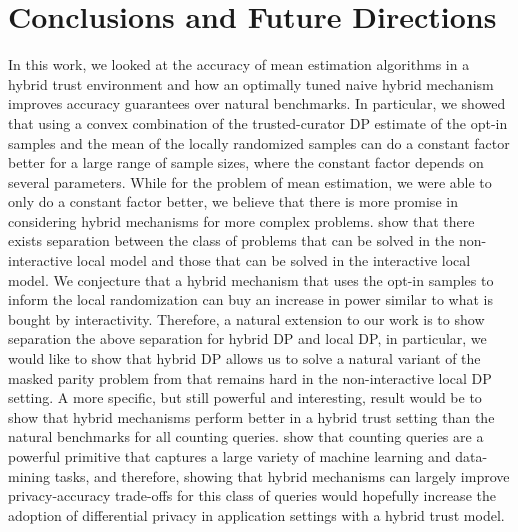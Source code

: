 \documentclass{article}
\theoremstyle{plain}
\begin{document}
\section{Conclusions and Future Directions}
In this work, we looked at the accuracy of mean estimation algorithms in a hybrid trust environment and how an optimally tuned naive hybrid mechanism improves accuracy guarantees over natural benchmarks. In particular, we showed that using a convex combination of the trusted-curator DP estimate of the opt-in samples and the mean of the locally randomized samples can do a constant factor better for a large range of sample sizes, where the constant factor depends on several parameters. While for the problem of mean estimation, we were able to only do a constant factor better, we believe that there is more promise in considering hybrid mechanisms for more complex problems. \cite{Kasiviswanathan:2011:WLP:2078965.2078976} show that there exists separation between the class of problems that can be solved in the non-interactive local model and those that can be solved in the interactive local model. We conjecture that a hybrid mechanism that uses the opt-in samples to inform the local randomization can buy an increase in power similar to what is bought by interactivity. Therefore, a natural extension to our work is to show separation the above separation for hybrid DP and local DP, in particular, we would like to show that hybrid DP allows us to solve a natural variant of the masked parity problem from \cite{Kasiviswanathan:2011:WLP:2078965.2078976} that remains hard in the non-interactive local DP setting. A more specific, but still powerful and interesting, result would be to show that hybrid mechanisms perform better in a hybrid trust setting than the natural benchmarks for all counting queries. \cite{Blum:2005:PPS:1065167.1065184} show that counting queries are a powerful primitive that captures a large variety of machine learning and data-mining tasks, and therefore, showing that hybrid mechanisms can largely improve privacy-accuracy trade-offs for this class of queries would hopefully increase the adoption of differential privacy in application settings with a hybrid trust model. 

\small


\end{document}
